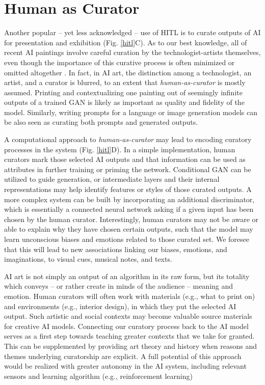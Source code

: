 \documentclass[letterpaper]{article} %
\begin{document}
\section{Human as Curator}

Another popular -- yet less acknowledged -- use of HITL is to curate outputs of AI for presentation and exhibition (Fig. \ref{hitl}C). As to our best knowledge, all of recent AI paintings involve careful curation by the technologist-artists themselves, even though the importance of this curative process is often minimized or omitted altogether \cite[e.g.][]{GANEdmondBelamy, Elgammal2017}. In fact, in AI art, the distinction among a technologist, an artist, and a curator is blurred, to an extent that \emph{human-as-curator} is mostly assumed. Printing and contextualizing one painting out of seemingly infinite outputs of a trained GAN is likely as important as quality and fidelity of the model. Similarly, writing prompts for a language or image generation models can be also seen as curating both prompts and generated outputs.

A computational approach to \emph{human-as-curator} may lead to encoding curatory processes in the system (Fig. \ref{hitl}D). In a simple implementation, human curators mark those selected AI outputs and that information can be used as attributes in further training or priming the network. Conditional GAN \cite{Mirza2014} can be utilized to guide generation, or intermediate layers and their internal representations may help identify features or styles of those curated outputs. A more complex system can be built by incorporating an additional discriminator, which is essentially a connected neural network asking if a given input has been chosen by the human curator. Interestingly, human curators may not be aware or able to explain why they have chosen certain outputs, such that the model may learn unconscious biases and emotions related to those curated set. We foresee that this will lead to new associations linking our biases, emotions, and imaginations, to visual cues, musical notes, and texts.

AI art is not simply an output of an algorithm in its raw form, but its totality which conveys -- or rather create in minds of the audience -- meaning and emotion. Human curators will often work with materials (e.g., what to print on) and environments (e.g., interior design), in which they put the selected AI output. Such artistic and social contexts may become valuable source materials for creative AI models. Connecting our curatory process back to the AI model serves as a first step towards teaching greater contexts that we take for granted. This can be supplemented by providing art theory and history when reasons and themes underlying curatorship are explicit. A full potential of this approach would be realized with greater autonomy in the AI system, including relevant sensors and learning algorithm (e.g., reinforcement learning)
\end{document}
